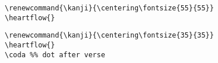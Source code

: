 \documentclass[letterpaper]{article}
\begin{document}
\begin{verbatim}
\renewcommand{\kanji}{\centering\fontsize{55}{55}}
\heartflow{}
\end{verbatim}

\vfill\eject\pagebreak

\vspace*{2cm}
\renewcommand{\kanji}{\centering\fontsize{40}{40}}
\textcolor{gray}{\kanji{四弘誓願}}
\vspace*{2cm}

\renewcommand{\kanji}{\centering\fontsize{35}{35}}
\begin{multicols}{7}
	
	\RLmulticolcolumns
    \coda
	\coda
	\coda
\end{multicols}	

\begin{verbatim}
\renewcommand{\kanji}{\centering\fontsize{35}{35}}
\heartflow{}
\coda %% dot after verse
\end{verbatim}
	
	\vfill\eject\pagebreak
	
	\vspace*{2cm}
	\renewcommand{\kanji}{\centering\fontsize{40}{40}}
	
\end{document}
